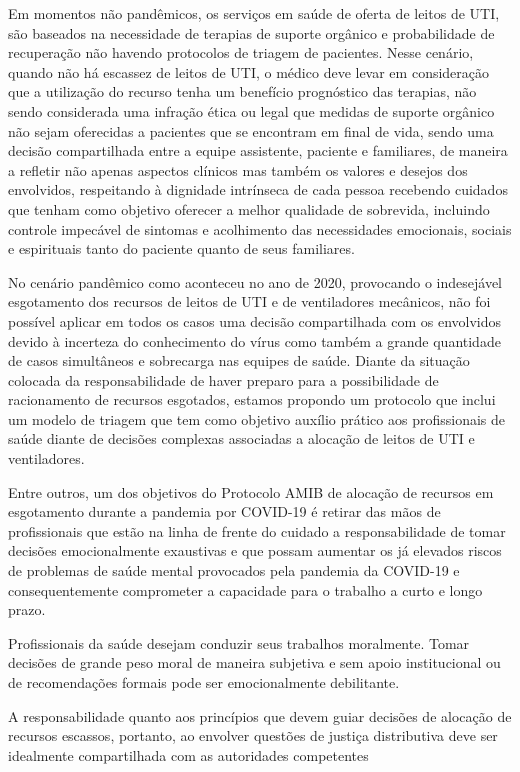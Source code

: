 \documentclass[12pt]{article}
\begin{document}
Em momentos não pandêmicos, os serviços em saúde de oferta de leitos de UTI, são baseados na necessidade de terapias de suporte orgânico e probabilidade de recuperação não havendo protocolos de triagem de pacientes. Nesse cenário, quando não há escassez de leitos de UTI, o médico deve levar em consideração que a utilização do recurso tenha um benefício prognóstico das terapias, não sendo considerada uma infração ética ou legal que medidas de suporte orgânico não sejam oferecidas a pacientes que se encontram em final de vida, sendo uma decisão compartilhada entre a equipe assistente, paciente e familiares, de maneira a refletir não apenas aspectos clínicos mas também os valores e desejos dos envolvidos, respeitando à dignidade intrínseca de cada pessoa recebendo cuidados que tenham como objetivo oferecer a melhor qualidade de sobrevida, incluindo controle impecável de sintomas e acolhimento das necessidades emocionais, sociais e espirituais tanto do paciente quanto de seus familiares.

No cenário pandêmico como aconteceu no ano de 2020, provocando o indesejável esgotamento dos recursos de leitos de UTI e de ventiladores mecânicos, não foi possível aplicar em todos os casos uma decisão compartilhada com os envolvidos devido à incerteza do conhecimento do vírus como também a grande quantidade de casos simultâneos e sobrecarga nas equipes de saúde. Diante da situação colocada da responsabilidade de haver preparo para a possibilidade de racionamento de recursos
esgotados, estamos propondo um protocolo que inclui um modelo de triagem que tem como objetivo auxílio prático aos profissionais de saúde diante de decisões complexas associadas a alocação de leitos de UTI e
ventiladores.


Entre outros, um dos objetivos do Protocolo AMIB de alocação de recursos em esgotamento durante a pandemia por COVID-19 é retirar das mãos de profissionais que estão na linha de frente do cuidado a responsabilidade de tomar decisões emocionalmente exaustivas e que possam aumentar os já elevados riscos de problemas de saúde mental provocados pela pandemia da COVID-19 e consequentemente comprometer a capacidade para o trabalho a curto e longo prazo.

Profissionais da saúde desejam conduzir seus trabalhos moralmente. Tomar decisões de grande peso moral de maneira subjetiva e sem apoio institucional ou de recomendações formais pode ser emocionalmente debilitante.

A responsabilidade quanto aos princípios que devem guiar decisões de alocação de recursos escassos, portanto, ao envolver questões de justiça distributiva deve ser idealmente compartilhada com as autoridades competentes
\end{document}

